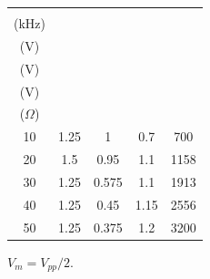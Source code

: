 \begin{center}
\begin{minipage}{\linewidth}\centering
\small
\setlength{\tabcolsep}{3pt}
\label{tab:rl}
\begin{tabular}{ccccc}
\toprule
\shortstack{$f_{\rm nom}$\\(kHz)} & \shortstack{$V_{G,m}$\\(V)} & \shortstack{$V_{R,m}$\\(V)} & \shortstack{$V_{L,m}$\\(V)} & \shortstack{$X_{L,\rm exp}$\\($\Omega$)} \\
\midrule
\num{10} & \num{1.25} & \num{1} & \num{0.7} & \num{700} \\
\num{20} & \num{1.5} & \num{0.95} & \num{1.1} & \num{1158} \\
\num{30} & \num{1.25} & \num{0.575} & \num{1.1} & \num{1913} \\
\num{40} & \num{1.25} & \num{0.45} & \num{1.15} & \num{2556} \\
\num{50} & \num{1.25} & \num{0.375} & \num{1.2} & \num{3200} \\
\bottomrule
\end{tabular}
\par\vspace{3pt}\begin{minipage}{.96\linewidth}\footnotesize $V_m=V_{pp}/2$.\end{minipage}
\end{minipage}
\end{center}
